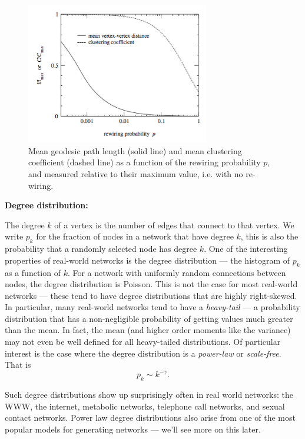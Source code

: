 \documentclass{article}
\begin{document}
\begin{figure}
	\begin{center}
		\includegraphics[width = 8cm]{smallWorld.png}
	\end{center}
	\caption{Mean geodesic path length (solid line) and mean clustering coefficient (dashed line) as a function of the rewiring probability $p$, and measured relative to their maximum value, i.e. with no re-wiring.}
	\label{fig2}
\end{figure}


{\bf Degree distribution:}

The degree $k$ of a vertex is the number of edges that connect to that vertex. We write $p_k$ for the fraction of nodes in a network that have degree $k$, this is also the probability that a randomly selected node has degree $k$. One of the interesting properties of real-world networks is the degree distribution --- the histogram of $p_k$ as a function of $k$. For a network with uniformly random connections between nodes, the degree distribution is Poisson. This is not the case for most real-world networks --- these tend to have degree distributions that are highly right-skewed. In particular, many real-world networks tend to have a \emph{heavy-tail} --- a probability distribution that has a non-negligible probability of getting values much greater than the mean. In fact, the mean (and higher order moments like the variance) may not even be well defined for all heavy-tailed distributions.  Of particular interest is the case where the degree distribution is a \emph{power-law} or \emph{scale-free}. That is
$$
 p_k \sim k^{-\gamma}.
$$

Such degree distributions show up surprisingly often in real world networks: the WWW, the internet, metabolic networks, telephone call networks, and sexual contact networks. Power law degree distributions also arise from one of the most popular models for generating networks --- we'll see more on this later.
\end{document}
